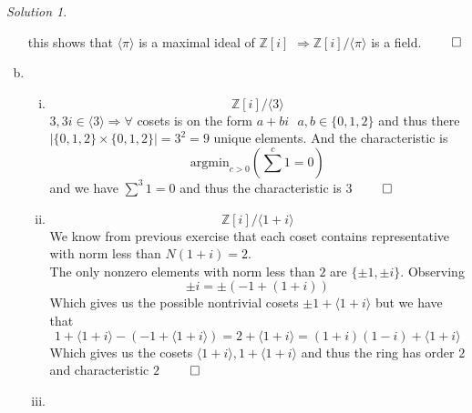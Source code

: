\documentclass[a4paper,twoside=false,abstract=false,numbers=noenddot,
titlepage=false,headings=small,parskip=half,version=last]{scrartcl}
\theoremstyle{definition}
\theoremstyle{remark}
\newtheorem*{solution}{Solution}
\newcommand{\ZZ}{\ensuremath{\mathbb{Z}}}
\begin{document}
\begin{solution}
\begin{enumerate}[a)]
\begin{description}
        \end{description}
        this shows that $\langle\pi\rangle$ is a maximal ideal of
        $\ZZ\left[i\right]$ $\Rightarrow \ZZ\left[i\right]/\langle\pi\rangle$
        is a field. $\qed$ 
    \item 
        \begin{enumerate}[i.]
            \item
                \begin{equation}
                    \ZZ\left[i\right]/\langle3\rangle
                \end{equation}
                $3,3i\in\langle 3\rangle \Rightarrow \forall$ cosets is on the
                form $a+bi~~~a,b\in\{0,1,2\}$ and thus there 
                $|\{0,1,2\}\times\{0,1,2\}|=3^2=9$ unique elements.
                And the characteristic is 
                \begin{equation}
                    \text{argmin}_{c>0}(\sum^c{1}=0) 
                \end{equation}
                and we have $\sum^3{1}=0$ and thus the characteristic is $3$
                $\qed$
            \item
                \begin{equation}
                    \ZZ\left[i\right]/\langle1+i\rangle
                \end{equation}
                We know from previous exercise that each coset contains
                representative with norm less than $N(1+i)=2$.\\
                The only nonzero elements with norm less than $2$ are $\{\pm
                1,\pm i\}$. Observing
                \begin{equation}
                    \pm i=\pm(-1+(1+i))
                \end{equation}
                Which gives us the possible nontrivial cosets $\pm 1+\langle 1+i \rangle$
                but we have that 
                \begin{equation}
                    1+\langle 1+i \rangle-(-1+\langle 1+i \rangle)
                    =2+\langle 1+i \rangle=(1+i)(1-i)+\langle 1+i \rangle
                \end{equation}
                Which gives us the cosets $\langle 1+i \rangle,1+\langle 1+i
                \rangle$
                and thus the ring has order $2$ and characteristic $2$ $\qed$
            \item
                \begin{equation}

\end{equation}
\end{enumerate}
\end{enumerate}
\end{solution}
\end{document}
